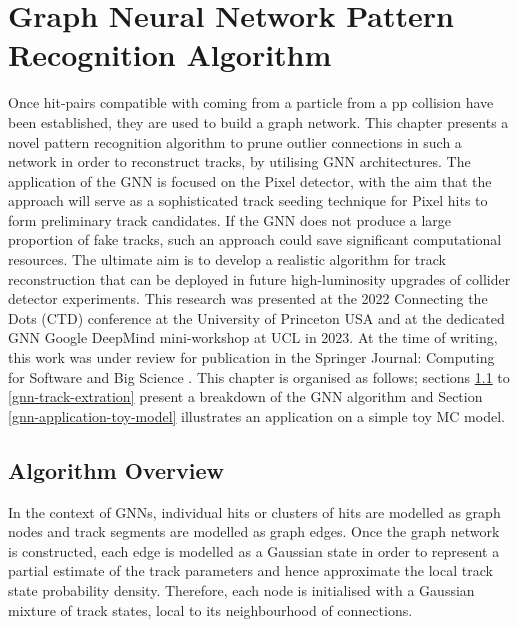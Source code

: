 
\chapter{Graph Neural Network Pattern Recognition Algorithm}\label{chapter-5}

Once hit-pairs compatible with coming from a particle from a pp collision have been established, they are used to build a graph network. This chapter presents a novel pattern recognition algorithm to prune outlier connections in such a network in order to reconstruct tracks, by utilising GNN architectures. The application of the GNN is focused on the Pixel detector, with the aim that the approach will serve as a sophisticated track seeding technique for Pixel hits to form preliminary track candidates. If the GNN does not produce a large proportion of fake tracks, such an approach could save significant computational resources. The ultimate aim is to develop a realistic algorithm for track reconstruction that can be deployed in future high-luminosity upgrades of collider detector experiments. This research was presented at the 2022 Connecting the Dots (CTD) conference at the University of Princeton USA and at the dedicated GNN Google DeepMind mini-workshop at UCL in 2023. At the time of writing, this work was under review for publication in the Springer Journal: Computing for Software and Big Science \cite{Lad_2023_gnn}. This chapter is organised as follows; sections \ref{gnn-algorithm-overview} to \ref{gnn-track-extration} present a breakdown of the GNN algorithm and Section \ref{gnn-application-toy-model} illustrates an application on a simple toy MC model.


\section{Algorithm Overview}
\label{gnn-algorithm-overview}

In the context of GNNs, individual hits or clusters of hits are modelled as graph nodes and track segments are modelled as graph edges. Once the graph network is constructed, each edge is modelled as a Gaussian state in order to represent a partial estimate of the track parameters and hence approximate the local track state probability density. Therefore, each node is initialised with a Gaussian mixture of track states, local to its neighbourhood of connections.

